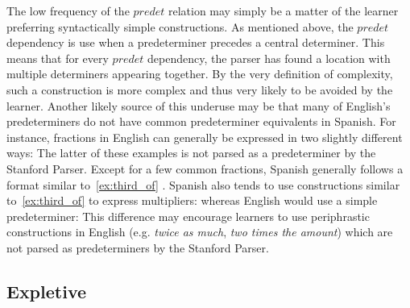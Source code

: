 \documentclass[main.tex]{subfiles}
\begin{document}
The low frequency of the $predet$ relation may simply be a matter of the learner preferring syntactically simple constructions. As mentioned above, the $predet$ dependency is use when a predeterminer precedes a central determiner. This means that for every $predet$ dependency, the parser has found a location with multiple determiners appearing together. By the very definition of complexity, such a construction is more complex and thus very likely to be avoided by the learner. Another likely source of this underuse may be that many of English's predeterminers do not have common predeterminer equivalents in Spanish. For instance, fractions in English can generally be expressed in two slightly different ways:
The latter of these examples is not parsed as a predeterminer by the Stanford Parser. Except for a few common fractions, Spanish generally follows a format similar to~\ref{ex:third_of} \citet[Ch. 10.10]{butt}. Spanish also tends to use constructions similar to~\ref{ex:third_of} to express multipliers:
whereas English would use a simple predeterminer:
This difference may encourage learners to use periphrastic constructions in English (e.g. \textit{twice as much}, \textit{two times the amount}) which are not parsed as predeterminers by the Stanford Parser.




\subsection{Expletive}
\end{document}
